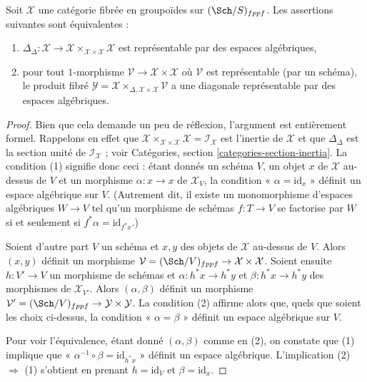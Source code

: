 \begin{lemma}
\label{lemma-second-diagonal}
Soit $\mathcal{X}$ une catégorie fibrée en groupoïdes sur $(\Sch/S)_{fppf}$.
Les assertions suivantes sont équivalentes :
\begin{enumerate}
\item $\Delta_\Delta : \mathcal{X} \to
\mathcal{X} \times_{\mathcal{X} \times \mathcal{X}} \mathcal{X}$
est représentable par des espaces algébriques,
\item pour tout $1$-morphisme $\mathcal{V} \to \mathcal{X} \times \mathcal{X}$
où $\mathcal{V}$ est représentable (par un schéma), le produit fibré
$\mathcal{Y} =
\mathcal{X} \times_{\Delta, \mathcal{X} \times \mathcal{X}} \mathcal{V}$
a une diagonale représentable par des espaces algébriques.
\end{enumerate}
\end{lemma}

\begin{proof}
Bien que cela demande un peu de réflexion, l'argument est entièrement formel.
Rappelons en effet que
$\mathcal{X} \times_{\mathcal{X} \times \mathcal{X}} \mathcal{X} =
\mathcal{I}_\mathcal{X}$ est l'inertie de $\mathcal{X}$ et que
$\Delta_\Delta$ est la section unité de $\mathcal{I}_\mathcal{X}$ ; voir
Catégories, section \ref{categories-section-inertia}.
La condition (1) signifie donc ceci : étant donnés un schéma $V$, un objet $x$ de
$\mathcal{X}$ au-dessus de $V$ et un morphisme $\alpha : x \to x$ de $\mathcal{X}_V$,
la condition « $\alpha = \text{id}_x$ » définit un espace algébrique sur $V$.
(Autrement dit, il existe un monomorphisme d'espaces algébriques $W \to V$
tel qu'un morphisme de schémas $f : T \to V$ se factorise par $W$
si et seulement si $f^*\alpha = \text{id}_{f^*x}$.)

\medskip\noindent
Soient d'autre part $V$ un schéma et $x, y$ des objets de
$\mathcal{X}$ au-dessus de $V$. Alors $(x, y)$ définit un morphisme
$\mathcal{V} = (\Sch/V)_{fppf} \to \mathcal{X} \times \mathcal{X}$.
Soient ensuite $h : V' \to V$ un morphisme de schémas et
$\alpha : h^*x \to h^*y$ et $\beta : h^*x \to h^*y$ des morphismes
de $\mathcal{X}_{V'}$. Alors $(\alpha, \beta)$ définit un morphisme
$\mathcal{V}' = (\Sch/V)_{fppf} \to \mathcal{Y} \times \mathcal{Y}$.
La condition (2) affirme alors que, quels que soient les choix ci-dessus, la
condition « $\alpha = \beta$ » définit un espace algébrique sur $V$.

\medskip\noindent
Pour voir l'équivalence, étant donné $(\alpha, \beta)$ comme en (2), on constate que
(1) implique que « $\alpha^{-1} \circ \beta = \text{id}_{h^*x}$ »
définit un espace algébrique. L'implication (2) $\Rightarrow$ (1)
s'obtient en prenant $h = \text{id}_V$ et $\beta = \text{id}_x$.
\end{proof}











